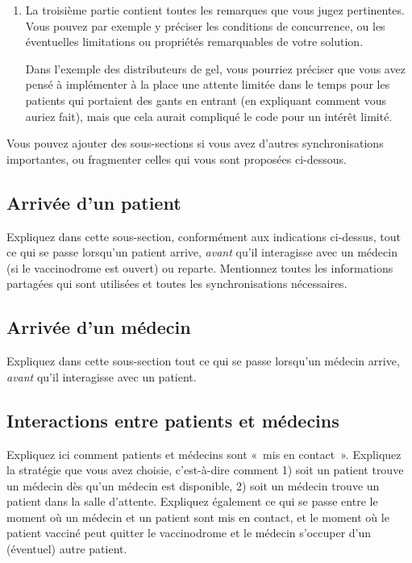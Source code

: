\documentclass[a4paper]{article}
\makeatletter
\newenvironment{expl}{%
  \begin{list}{}{%
    \small\itshape%
    \topsep\z@%
    \listparindent0pt%
    \parsep0.75\baselineskip%
    \setlength{\leftmargin}{20mm}%
    \setlength{\rightmargin}{20mm}%
  }
    \item[]}%
    {\end{list}}
\makeatother
\begin{document}
\begin{expl}
\begin{enumerate}
      \item La troisième partie contient toutes les remarques que vous
      jugez pertinentes. Vous pouvez par exemple y préciser les
      conditions de concurrence, ou les éventuelles limitations ou
      propriétés remarquables de votre solution.

      Dans l'exemple des distributeurs de gel, vous pourriez préciser
      que vous avez pensé à implémenter à la place une attente limitée
      dans le temps pour les patients qui portaient des gants en entrant
      (en expliquant comment vous auriez fait), mais que cela aurait
      compliqué le code pour un intérêt limité.
    \end{enumerate}

    Vous pouvez ajouter des sous-sections si vous avez d'autres
    synchronisations importantes, ou fragmenter celles qui vous sont
    proposées ci-dessous.
  \end{expl}


  \subsection{Arrivée d'un patient}\label{arrivee-patient}

  \begin{expl}
    Expliquez dans cette sous-section, conformément aux indications
    ci-dessus, tout ce qui se passe lorsqu'un patient arrive,
    \emph{avant} qu'il interagisse avec un médecin (si le vaccinodrome
    est ouvert) ou reparte. Mentionnez toutes les informations
    partagées qui sont utilisées et toutes les synchronisations
    nécessaires.
  \end{expl}

  \subsection{Arrivée d'un médecin}

  \begin{expl}
    Expliquez dans cette sous-section tout ce qui se passe lorsqu'un
    médecin arrive, \emph{avant} qu'il interagisse avec un patient.
  \end{expl}

  \subsection{Interactions entre patients et médecins}

  \begin{expl}
    Expliquez ici comment patients et médecins sont «~mis en contact~».
    Expliquez la stratégie que vous avez choisie, c'est-à-dire comment
    1) soit un patient trouve un médecin dès qu'un médecin est
    disponible, 2) soit un médecin trouve un patient dans la salle
    d'attente. Expliquez également ce qui se passe entre le moment où un
    médecin et un patient sont mis en contact, et le moment où le
    patient vacciné peut quitter le vaccinodrome et le médecin s'occuper
    d'un (éventuel) autre patient.
  \end{expl}
\end{document}
